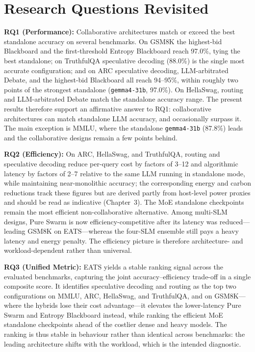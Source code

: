 \section{Research Questions Revisited}

\textbf{RQ1 (Performance):} Collaborative architectures match or exceed the best standalone accuracy on several benchmarks. On GSM8K the highest-bid Blackboard and the first-threshold Entropy Blackboard reach 97.0\%, tying the best standalone; on TruthfulQA speculative decoding (88.0\%) is the single most accurate configuration; and on ARC speculative decoding, LLM-arbitrated Debate, and the highest-bid Blackboard all reach 94--95\%, within roughly two points of the strongest standalone (\texttt{gemma4-31b}, 97.0\%). On HellaSwag, routing and LLM-arbitrated Debate match the standalone accuracy range. The present results therefore support an affirmative answer to RQ1: collaborative architectures can match standalone LLM accuracy, and occasionally surpass it. The main exception is MMLU, where the standalone \texttt{gemma4-31b} (87.8\%) leads and the collaborative designs remain a few points behind.

\textbf{RQ2 (Efficiency):} On ARC, HellaSwag, and TruthfulQA, routing and speculative decoding reduce per-query cost by factors of 3--12 and algorithmic latency by factors of 2--7 relative to the same LLM running in standalone mode, while maintaining near-monolithic accuracy; the corresponding energy and carbon reductions track these figures but are derived partly from host-level power proxies and should be read as indicative (Chapter~3). The MoE standalone checkpoints remain the most efficient non-collaborative alternative. Among multi-SLM designs, Pure Swarm is now efficiency-competitive after its latency was reduced---leading GSM8K on EATS---whereas the four-SLM ensemble still pays a heavy latency and energy penalty. The efficiency picture is therefore architecture- and workload-dependent rather than universal.

\textbf{RQ3 (Unified Metric):} EATS yields a stable ranking signal across the evaluated benchmarks, capturing the joint accuracy--efficiency trade-off in a single composite score. It identifies speculative decoding and routing as the top two configurations on MMLU, ARC, HellaSwag, and TruthfulQA, and on GSM8K---where the hybrids lose their cost advantage---it elevates the lower-latency Pure Swarm and Entropy Blackboard instead, while ranking the efficient MoE standalone checkpoints ahead of the costlier dense and heavy models. The ranking is thus stable in behaviour rather than identical across benchmarks: the leading architecture shifts with the workload, which is the intended diagnostic.

